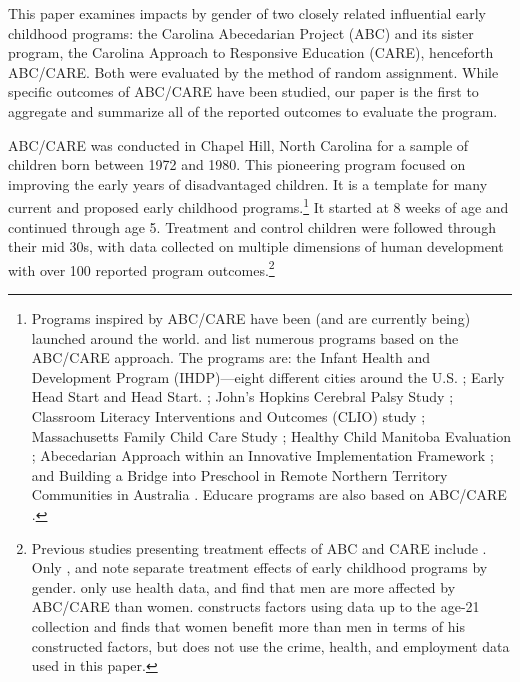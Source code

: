 This paper examines impacts by gender of two closely related influential early childhood programs: the Carolina Abecedarian Project (ABC) and its sister program, the Carolina Approach to Responsive Education (CARE), henceforth ABC/CARE. Both were evaluated by the method of random assignment. While specific outcomes of ABC/CARE have been studied, our paper is the first to aggregate and summarize all of the reported outcomes to evaluate the program.

ABC/CARE was conducted in Chapel Hill, North Carolina for a sample of children born between 1972 and 1980. This pioneering program focused on improving the early years of disadvantaged children. It is a template for many current and proposed early childhood programs.\footnote{Programs inspired by ABC/CARE have been (and are currently being) launched around the world. \citet{Sparling_2010_Highlights} and \citet{Ramey_Ramey_Lanzi_2014_Interventions} list numerous programs based on the ABC/CARE approach. The programs are: the Infant Health and Development Program (IHDP)---eight different cities around the U.S. \citep{Spiker-etal_1997_Helping}; Early Head Start and Head Start. \citep{Schneider_McDonald-eds_2007_Scale-Up_Vol-1}; John's Hopkins Cerebral Palsy Study \citep{Sparling_2010_Highlights}; Classroom Literacy Interventions and Outcomes (CLIO) study \citep{Sparling_2010_Highlights}; Massachusetts Family Child Care Study \citep{Collins_etal_2010_Massachusetts-Study}; Healthy Child Manitoba Evaluation \citep{Healthy_Child_Manitoba_2015_Starting-Early}; Abecedarian Approach within an Innovative Implementation Framework \citep{Jensen_Nielsen_2016_ABC-Programme-Pilot}; and Building a Bridge into Preschool in Remote Northern Territory Communities in Australia \citep{UMonash_Dataset_2015_URL}. Educare programs are also based on ABC/CARE \citep{Educare_2014_Research_Agenda,Yazejian_Bryant_2012_Educare}.} It started at 8 weeks of age and continued through age 5. Treatment and control children were followed through their mid 30s, with data collected on multiple dimensions of human development with over 100 reported program outcomes.\footnote{Previous studies presenting treatment effects of ABC and CARE include \citet{Ramey_etal_1985_Project-CARE_TiECSE,Clarke_Campbell_1998_ABC_Comparison_ECRQ,Campbell_Pungello_etal_2001_DP,Campbell_Ramey_etal_2002_ADS,Anderson_2008_JASA,Campbell_Wasik_etal_2008_ECRQ,Campbell_Conti_etal_2014_EarlyChildhoodInvestments}. Only \citet{Heckman_2006_Science}, \citet{Anderson_2008_JASA} and \citet{Campbell_Conti_etal_2014_EarlyChildhoodInvestments} note separate treatment effects of early childhood programs by gender. \citet{Campbell_Conti_etal_2014_EarlyChildhoodInvestments} only use health data, and find that men are more affected by ABC/CARE than women. \citet{Anderson_2008_JASA} constructs factors using data up to the age-21 collection and finds that women benefit more than men in terms of his constructed factors, but does not use the crime, health, and employment data used in this paper.}

